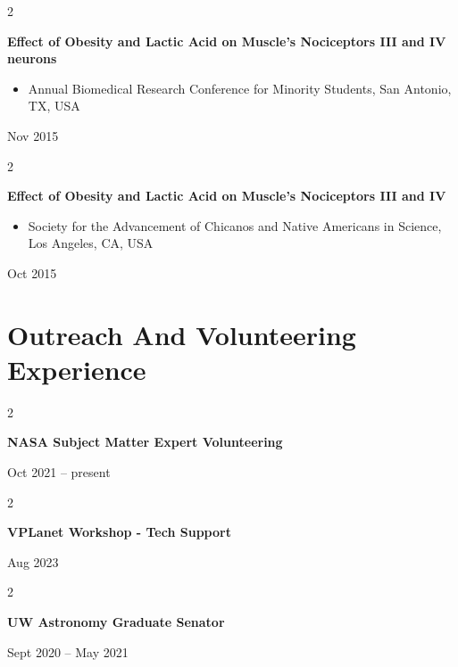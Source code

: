 \documentclass[10pt, letterpaper]{article}
\newenvironment{highlights}{
    \begin{itemize}[
        topsep=0.10 cm,
        parsep=0.10 cm,
        partopsep=0pt,
        itemsep=0pt,
        leftmargin=0.4 cm + 10pt
    ]
}{
    \end{itemize}
} %
\newenvironment{twocolentry}[2][]{
    \onecolentry
    \def\secondColumn{#2}
    \setcolumnwidth{\fill, 4.5 cm}
    \begin{paracol}{2}
}{
    \switchcolumn \raggedleft \secondColumn
    \end{paracol}
    \endonecolentry
} %
\begin{document}
        \vspace{0.2 cm}

        \begin{twocolentry}{
            Nov 2015
        }
            \textbf{Effect of Obesity and Lactic Acid on Muscle's Nociceptors III and IV neurons}
            \begin{highlights}
                \item Annual Biomedical Research Conference for Minority Students, San Antonio, TX, USA
            \end{highlights}
        \end{twocolentry}


        \vspace{0.2 cm}

        \begin{twocolentry}{
            Oct 2015
        }
            \textbf{Effect of Obesity and Lactic Acid on Muscle's Nociceptors III and IV}
            \begin{highlights}
                \item Society for the Advancement of Chicanos and Native Americans in Science, Los Angeles, CA, USA
            \end{highlights}
        \end{twocolentry}



    
    \section{Outreach And Volunteering Experience}



        
        \begin{twocolentry}{
            Oct 2021 – present
        }
            \textbf{NASA Subject Matter Expert Volunteering}
        \end{twocolentry}


        \vspace{0.2 cm}

        \begin{twocolentry}{
            Aug 2023
        }
            \textbf{VPLanet Workshop - Tech Support}
        \end{twocolentry}


        \vspace{0.2 cm}

        \begin{twocolentry}{
            Sept 2020 – May 2021
        }
            \textbf{UW Astronomy Graduate Senator}
        \end{twocolentry}
\end{document}
